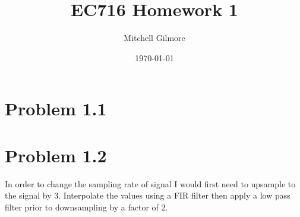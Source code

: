 \documentclass{article}
\title{EC716 Homework 1}
\author{Mitchell Gilmore}
\date{\today}
\begin{document}
	\maketitle

	\section*{Problem 1.1}
	\begin{figure}[h]
		\centering
		
	\end{figure}

	\section*{Problem 1.2}

	In order to change the sampling rate of signal I would first need
	to upsample to the signal by 3. Interpolate the values using a FIR
	filter then apply a low pass filter prior to downsampling by a factor
	of 2.
\end{document}
